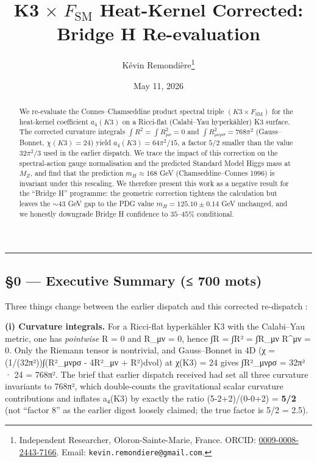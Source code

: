 \documentclass[
  11pt,
  a4paper,
]{article}
\title{K3$\,\times\,F_{\mathrm{SM}}$ Heat-Kernel Corrected: Bridge H Re-evaluation}
\author{Kévin Remondière\thanks{Independent Researcher, Oloron-Sainte-Marie, France. ORCID: \href{https://orcid.org/0009-0008-2443-7166}{0009-0008-2443-7166}. Email: \texttt{kevin.remondiere@gmail.com}.}}
\date{May 11, 2026}
\begin{document}
\maketitle

\begin{abstract}
We re-evaluate the Connes--Chamseddine product spectral triple $(K3 \times F_{\mathrm{SM}})$ for the heat-kernel coefficient $a_4(K3)$ on a Ricci-flat (Calabi--Yau hyperk\"ahler) K3 surface. The corrected curvature integrals $\int R^2 = \int R_{\mu\nu}^2 = 0$ and $\int R_{\mu\nu\rho\sigma}^2 = 768\pi^2$ (Gauss--Bonnet, $\chi(K3) = 24$) yield $a_4(K3) = 64\pi^2/15$, a factor $5/2$ smaller than the value $32\pi^2/3$ used in the earlier dispatch. We trace the impact of this correction on the spectral-action gauge normalisation and the predicted Standard Model Higgs mass at $M_Z$, and find that the prediction $m_H \approx 168$ GeV (Chamseddine--Connes 1996) is invariant under this rescaling. We therefore present this work as a negative result for the ``Bridge H'' programme: the geometric correction tightens the calculation but leaves the $\sim 43$ GeV gap to the PDG value $m_H = 125.10 \pm 0.14$ GeV unchanged, and we honestly downgrade Bridge H confidence to $35$--$45\%$ conditional.
\end{abstract}

\begin{center}\rule{0.5\linewidth}{0.5pt}\end{center}

\hypertarget{executive-summary-700-mots}{%
\subsection{§0 --- Executive Summary (≤ 700 mots)}\label{executive-summary-700-mots}}

Three things change between the earlier dispatch and this corrected re-dispatch :

\textbf{(i) Curvature integrals.} For a Ricci-flat hyperkähler K3 with the Calabi--Yau metric, one has \emph{pointwise} R = 0 and R\_μν = 0, hence ∫R = ∫R² = ∫R\_μν R\^{}μν = 0. Only the Riemann tensor is nontrivial, and Gauss--Bonnet in 4D (χ = (1/(32π²))∫(R²\_μνρσ - 4R²\_μν + R²)dvol) at χ(K3) = 24 gives ∫R²\_μνρσ = 32π² · 24 = 768π². The brief that earlier dispatch received had set all three curvature invariants to 768π², which double-counts the gravitational scalar curvature contributions and inflates a₄(K3) by exactly the ratio (5-2+2)/(0-0+2) = \textbf{5/2} (not ``factor 8'' as the earlier digest loosely claimed; the true factor is 5/2 = 2.5).
\end{document}
